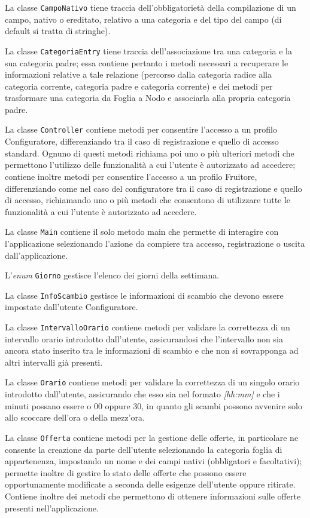 La classe \texttt{CampoNativo} tiene traccia dell'obbligatorietà della compilazione di un campo, nativo o ereditato, relativo a una categoria e del tipo del campo (di default si tratta di stringhe). 

La classe \texttt{CategoriaEntry} tiene traccia dell'associazione tra una categoria e la sua categoria padre; essa contiene pertanto i metodi necessari a recuperare le informazioni relative a tale relazione (percorso dalla categoria radice alla categoria corrente, categoria padre e categoria corrente) e dei metodi per trasformare una categoria da Foglia a Nodo e associarla alla propria categoria padre.

La classe \texttt{Controller} contiene metodi per consentire l'accesso a un profilo Configuratore, differenziando tra il caso di registrazione e quello di accesso standard. Ognuno di questi metodi richiama poi uno o più ulteriori metodi che permettono l'utilizzo delle funzionalità a cui l'utente è autorizzato ad accedere; contiene inoltre metodi per consentire l'accesso a un profilo Fruitore, differenziando come nel caso del configuratore tra il caso di registrazione e quello di accesso, richiamando uno o più metodi che consentono di utilizzare tutte le funzionalità a cui l'utente è autorizzato ad accedere.

La classe \texttt{Main} contiene il solo metodo main che permette di interagire con l'applicazione selezionando l'azione da compiere tra accesso, registrazione o uscita dall'applicazione.

L'\textit{enum} \texttt{Giorno} gestisce l'elenco dei giorni della settimana.

La classe \texttt{InfoScambio} gestisce le informazioni di scambio che devono essere impostate dall'utente Configuratore.

La classe \texttt{IntervalloOrario} contiene metodi per validare la correttezza di un intervallo orario introdotto dall'utente, assicurandosi che l'intervallo non sia ancora stato inserito tra le informazioni di scambio e che non si sovrapponga ad altri intervalli già presenti.

La classe \texttt{Orario} contiene metodi per validare la correttezza di un singolo orario introdotto dall'utente, assicurando che esso sia nel formato \textit{[hh:mm]} e che i minuti possano essere o 00 oppure 30, in quanto gli scambi possono avvenire solo allo scoccare dell'ora o della mezz'ora.

La classe \texttt{Offerta} contiene metodi per la gestione delle offerte, in particolare ne consente la creazione da parte dell'utente selezionando la categoria foglia di appartenenza, impostando un nome e dei campi nativi (obbligatori e facoltativi); permette inoltre di gestire lo stato delle offerte che possono essere opportunamente modificate a seconda delle esigenze dell'utente oppure ritirate. Contiene inoltre dei metodi che permettono di ottenere informazioni sulle offerte presenti nell'applicazione.

